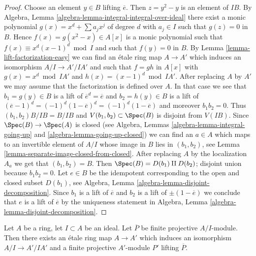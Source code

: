 \begin{proof}
Choose an element $y \in B$ lifting $\overline{e}$.
Then $z = y^2 - y$ is an element of $IB$. By
Algebra, Lemma \ref{algebra-lemma-integral-integral-over-ideal}
there exist a monic polynomial
$g(x) = x^d + \sum a_j x^j$ of degree $d$ with $a_j \in I$ such that
$g(z) = 0$ in $B$. Hence $f(x) = g(x^2 - x) \in A[x]$ is a monic
polynomial such that $f(x) \equiv x^d(x - 1)^d \bmod I$
and such that $f(y) = 0$ in $B$.
By Lemma \ref{lemma-lift-factorization-easy}
we can find an \'etale ring map $A \to A'$ which induces
an isomorphism $A/I \to A'/IA'$ and such that $f = gh$
in $A[x]$ with $g(x) = x^d \bmod IA'$ and $h(x) = (x - 1)^d \bmod IA'$.
After replacing $A$ by $A'$ we may assume that the factorization
is defined over $A$. In that case we see that
$b_1 = g(y) \in B$ is a lift of $\overline{e}^d = \overline{e}$ and
$b_2 = h(y) \in B$ is a lift of
$(\overline{e} - 1)^d = (-1)^d (1 - \overline{e})^d = (-1)^d(1 - \overline{e})$
and moreover $b_1b_2 = 0$. Thus $(b_1, b_2)B/IB = B/IB$ and
$V(b_1, b_2) \subset \Spec(B)$ is disjoint from $V(IB)$. Since
$\Spec(B) \to \Spec(A)$ is closed (see
Algebra, Lemmas \ref{algebra-lemma-integral-going-up} and
\ref{algebra-lemma-going-up-closed})
we can find an $a \in A$ which maps to an invertible element
of $A/I$ whose image in $B$ lies in $(b_1, b_2)$, see
Lemma \ref{lemma-separate-image-closed-from-closed}.
After replacing $A$ by the localization $A_a$ we get that
$(b_1, b_2) = B$. Then $\Spec(B) = D(b_1) \amalg D(b_2)$;
disjoint union because $b_1b_2 = 0$. Let $e \in B$ be the idempotent
corresponding to the open and closed subset $D(b_1)$, see
Algebra, Lemma \ref{algebra-lemma-disjoint-decomposition}.
Since $b_1$ is a lift of $\overline{e}$ and $b_2$ is a
lift of $\pm (1 - \overline{e})$ we conclude that $e$ is
a lift of $\overline{e}$ by the uniqueness statement in
Algebra, Lemma \ref{algebra-lemma-disjoint-decomposition}.
\end{proof}

\begin{lemma}
\label{lemma-lift-projective-module}
Let $A$ be a ring, let $I \subset A$ be an ideal.
Let $\overline{P}$ be finite projective $A/I$-module.
Then there exists an \'etale ring map $A \to A'$ which induces
an isomorphism $A/I \to A'/IA'$ and a finite projective
$A'$-module $P'$ lifting $\overline{P}$.
\end{lemma}

